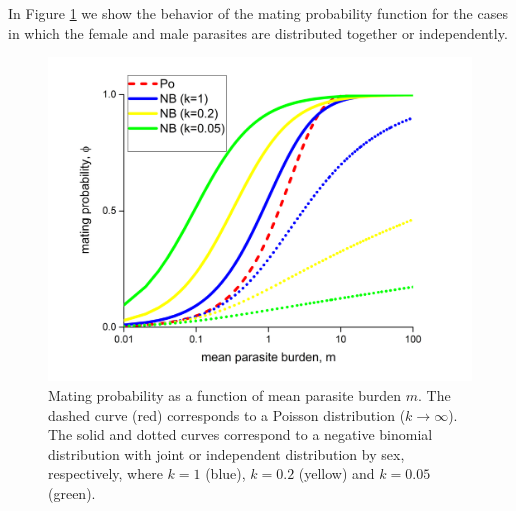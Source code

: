 \documentclass[bimj,fleqn]{w-art}
\theoremstyle{plain}
\theoremstyle{definition}
\begin{document}
In Figure \ref{fig:funphi} we show the behavior of the mating probability function for the cases in which the female and male parasites are distributed together or independently.
\begin{figure}
	\centering
	\includegraphics[width=0.99\linewidth]{phi-inde}
	\caption{Mating probability as a function of mean parasite burden $m$. The dashed curve (red) corresponds to a Poisson distribution ($k\to \infty$). 
		The solid and dotted curves correspond to a negative binomial distribution with joint or independent distribution by sex, respectively, where $k = 1$ (blue), $k =0.2$ (yellow) and $k =0.05$ (green).
	} 
	\label{fig:funphi}
\end{figure}
\end{document}
